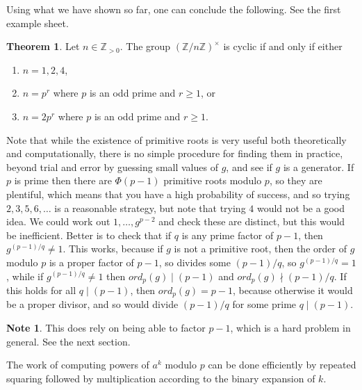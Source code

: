 \documentclass{article}
\newcommand{\Z}{\mathbb{Z}}
\newcommand{\rb}[1]{\left( #1 \right)}
\newcommand{\unit}[1]{\rb{\Z / #1\Z}^\times}
\theoremstyle{definition}\newtheorem{definition}{Definition}
\theoremstyle{definition}\newtheorem{remark}[definition]{Remark}
\theoremstyle{definition}\newtheorem*{example}{Example}
\theoremstyle{definition}\newtheorem*{note}{Note}
\newtheorem{theorem}[definition]{Theorem}
\begin{document}
Using what we have shown so far, one can conclude the following. See the first example sheet.

\begin{theorem}
Let $ n \in \Z_{> 0} $. The group $ \unit{n} $ is cyclic if and only if either
\begin{enumerate}
\item $ n = 1, 2, 4 $,
\item $ n = p^r $ where $ p $ is an odd prime and $ r \ge 1 $, or
\item $ n = 2p^r $ where $ p $ is an odd prime and $ r \ge 1 $.
\end{enumerate}
\end{theorem}


Note that while the existence of primitive roots is very useful both theoretically and computationally, there is no simple procedure for finding them in practice, beyond trial and error by guessing small values of $ g $, and see if $ g $ is a generator. If $ p $ is prime then there are $ \Phi\rb{p - 1} $ primitive roots modulo $ p $, so they are plentiful, which means that you have a high probability of success, and so trying $ 2, 3, 5, 6, \dots $ is a reasonable strategy, but note that trying $ 4 $ would not be a good idea. We could work out $ 1, \dots, g^{p - 2} $ and check these are distinct, but this would be inefficient. Better is to check that if $ q $ is any prime factor of $ p - 1 $, then $ g^{\rb{p - 1} / q} \ne 1 $. This works, because if $ g $ is not a primitive root, then the order of $ g $ modulo $ p $ is a proper factor of $ p - 1 $, so divides some $ \rb{p - 1} / q $, so $ g^{\rb{p - 1} / q} = 1 $, while if $ g^{\rb{p - 1} / q} \ne 1 $ then $ ord_p\rb{g} \mid \rb{p - 1} $ and $ ord_p\rb{g} \nmid \rb{p - 1} / q $. If this holds for all $ q \mid \rb{p - 1} $, then $ ord_p\rb{g} = p - 1 $, because otherwise it would be a proper divisor, and so would divide $ \rb{p - 1} / q $ for some prime $ q \mid \rb{p - 1} $.

\begin{note}
This does rely on being able to factor $ p - 1 $, which is a hard problem in general. See the next section.
\end{note}

The work of computing powers of $ a^k $ modulo $ p $ can be done efficiently by repeated squaring followed by multiplication according to the binary expansion of $ k $.
\end{document}
